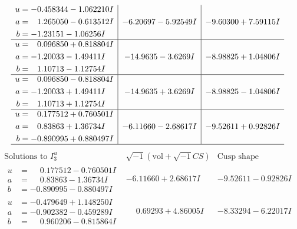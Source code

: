 \documentclass[1p]{elsarticle_modified}
\theoremstyle{definition}
\newcommand{\I}{\sqrt{-1}}
\begin{document}
$$\begin{array}{c|c|c}
\begin{aligned}
u &= -0.458344 - 1.062210 I \\
a &= \phantom{-}1.265050 - 0.613512 I \\
b &= -1.23151 - 1.06256 I\end{aligned}
 & -6.20697 - 5.92549 I & -9.60300 + 7.59115 I \\ \hline\begin{aligned}
u &= \phantom{-}0.096850 + 0.818804 I \\
a &= -1.20033 - 1.49411 I \\
b &= \phantom{-}1.10713 - 1.12754 I\end{aligned}
 & -14.9635 - 3.6269 I & -8.98825 + 1.04806 I \\ \hline\begin{aligned}
u &= \phantom{-}0.096850 - 0.818804 I \\
a &= -1.20033 + 1.49411 I \\
b &= \phantom{-}1.10713 + 1.12754 I\end{aligned}
 & -14.9635 + 3.6269 I & -8.98825 - 1.04806 I \\ \hline\begin{aligned}
u &= \phantom{-}0.177512 + 0.760501 I \\
a &= \phantom{-}0.83863 + 1.36734 I \\
b &= -0.890995 + 0.880497 I\end{aligned}
 & -6.11660 - 2.68617 I & -9.52611 + 0.92826 I\\
 \hline 
 \end{array}$$\newpage$$\begin{array}{c|c|c}  
\text{Solutions to }I^u_{3}& \I (\text{vol} + \sqrt{-1}CS) & \text{Cusp shape}\\
 \hline 
\begin{aligned}
u &= \phantom{-}0.177512 - 0.760501 I \\
a &= \phantom{-}0.83863 - 1.36734 I \\
b &= -0.890995 - 0.880497 I\end{aligned}
 & -6.11660 + 2.68617 I & -9.52611 - 0.92826 I \\ \hline\begin{aligned}
u &= -0.479649 + 1.148250 I \\
a &= -0.902382 - 0.459289 I \\
b &= \phantom{-}0.960206 - 0.815864 I\end{aligned}
 & \phantom{-}0.69293 + 4.86005 I & -8.33294 - 6.22017 I \\ \hline\begin{aligned}

\end{aligned}
\end{array}$$
\end{document}
